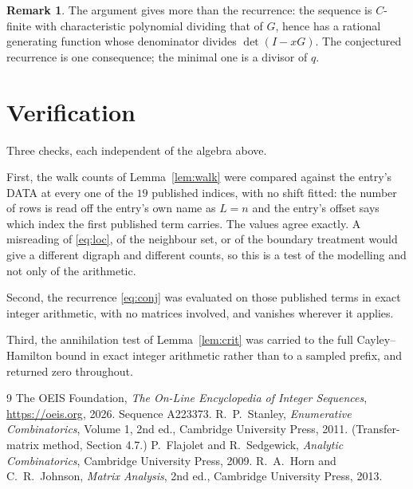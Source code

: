 \documentclass[11pt,a4paper]{article}
\theoremstyle{plain}
\theoremstyle{definition}
\newtheorem{remark}[theorem]{Remark}
\begin{document}
\begin{remark}
The argument gives more than the recurrence: the sequence is $C$-finite with characteristic
polynomial dividing that of $G$, hence has a rational generating function whose denominator
divides $\det(I-xG)$. The conjectured recurrence is one consequence; the minimal one is a
divisor of $q$.
\end{remark}

\section{Verification}

Three checks, each independent of the algebra above.

First, the walk counts of Lemma~\ref{lem:walk} were compared against the entry's DATA at
every one of the $19$ published indices, with no shift fitted: the number of rows is
read off the entry's own name as $L=n$ and the entry's offset says which index the first
published term carries. The values agree exactly. A misreading of \eqref{eq:loc}, of the
neighbour set, or of the boundary treatment would give a different digraph and different
counts, so this is a test of the modelling and not only of the arithmetic.

Second, the recurrence \eqref{eq:conj} was evaluated on those published terms in exact
integer arithmetic, with no matrices involved, and vanishes wherever it applies.

Third, the annihilation test of Lemma~\ref{lem:crit} was carried to the full
Cayley--Hamilton bound in exact integer arithmetic rather than to a sampled prefix, and
returned zero throughout.

\begin{thebibliography}{9}
 The OEIS Foundation, \emph{The On-Line Encyclopedia of Integer
Sequences}, \url{https://oeis.org}, 2026. Sequence A223373.
 R.~P.~Stanley, \emph{Enumerative Combinatorics}, Volume 1, 2nd ed.,
Cambridge University Press, 2011. (Transfer-matrix method, Section 4.7.)
 P.~Flajolet and R.~Sedgewick, \emph{Analytic Combinatorics}, Cambridge
University Press, 2009.
 R.~A.~Horn and C.~R.~Johnson, \emph{Matrix Analysis}, 2nd ed., Cambridge
University Press, 2013.
\end{thebibliography}
\end{document}

